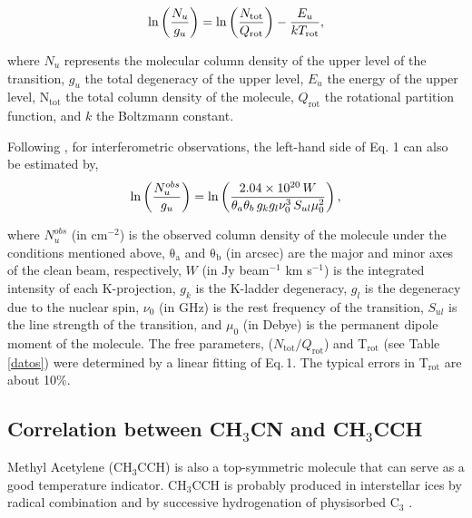 \documentclass[baaa]{baaa}
\begin{document}
\begin{equation}
        {\rm ln}\left (\frac{N_u}{g_u}  \right ) = {\rm ln}\left ( \frac{N_\mathrm{tot}}{Q_\mathrm{rot}} \right )-\frac{E_u}{kT_\mathrm{rot}},
\end{equation}

\noindent where $N_u$ represents the molecular column density of the upper level of the transition, $g_u$ the total degeneracy of the upper level, $E_u$ the energy of the upper level, N$_\mathrm{tot}$ the total column density of the molecule, $Q_\mathrm{rot}$ the rotational partition function, and $k$ the Boltzmann constant.

Following \citet{miao95}, for interferometric observations, the left-hand side of Eq. 1 can also be estimated by,\\

\begin{equation}
{\rm ln}\left (\frac{N_u^{obs}}{g_u}  \right ) = {\rm ln}\left ( \frac{2.04\times10^{20}\,W}{\theta_a \theta_b\,g_kg_l\nu_0^{3}\,S_{ul} \mu_0^{2} } \right ),
\end{equation}


\noindent where $N_u^{obs}$ (in $\mathrm{cm^{-2}}$) is the observed column density of the molecule under the conditions mentioned above, $\mathrm{\theta_a}$ and $\mathrm{\theta_b}$ (in arcsec) are the major and minor axes of the clean beam, respectively, $W$ (in Jy beam$^{-1}$ km s$^{-1}$) is the integrated intensity of each K-projection, $g_k$ is the K-ladder degeneracy, $g_l$ is the degeneracy due to the nuclear spin, $\nu_0$ (in GHz) is the rest frequency of the transition, $S_{ul}$ is the line strength of the transition, and $\mu_0$ (in Debye) is the permanent dipole moment of the molecule. The free parameters, ($N_\mathrm{tot}/Q_\mathrm{rot}$) and T$_\mathrm{rot}$ (see Table\,\ref{datos}) were determined by a linear fitting of Eq.\,1. The typical errors in T$_\mathrm{rot}$ are about 10\%.\\


\subsection{Correlation between CH$_3$CN and CH$_3$CCH}

Methyl Acetylene (CH$_3$CCH) is also a top-symmetric molecule that can serve as a good temperature indicator. CH$_3$CCH is probably produced in interstellar ices by radical combination and by successive hydrogenation of physisorbed C$_3$ \citep{kalenskii,hickson16, wong18}.
\end{document}
